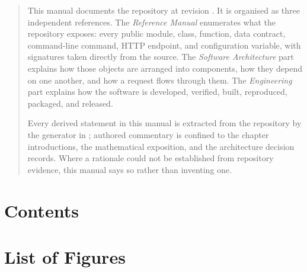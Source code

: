 \documentclass[10pt,a4paper,oneside]{report}
\begin{document}
\maketitle

\begin{abstract}
\noindent
This manual documents the \projectname{} repository at revision
\texttt{\projectrevision}. It is organised as three independent references.
The \emph{Reference Manual} enumerates what the repository exposes: every
public module, class, function, data contract, command-line command, HTTP
endpoint, and configuration variable, with signatures taken directly from the
source. The \emph{Software Architecture} part explains how those objects are
arranged into components, how they depend on one another, and how a request
flows through them. The \emph{Engineering} part explains how the software is
developed, verified, built, reproduced, packaged, and released.

Every derived statement in this manual is extracted from the repository by the
generator in ; authored commentary is confined to the
chapter introductions, the mathematical exposition, and the architecture
decision records. Where a rationale could not be established from repository
evidence, this manual says so rather than inventing one.
\end{abstract}

\cleardoublepage
{}
\chapter*{Contents}
\begin{multicols}{2}\small
\makeatletter{}\makeatother
\end{multicols}

\chapter*{List of Figures}
\begin{multicols}{2}\small
\makeatletter{}\makeatother
\end{multicols}
\end{document}
